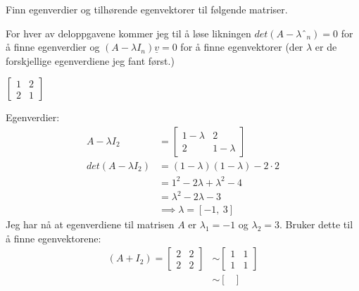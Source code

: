 \documentclass[11pt, a4paper, norsk]{NTNUoving}
\begin{document}
    \begin{oppgave}
        Finn egenverdier og tilhørende egenvektorer til følgende matriser.
        
        For hver av deloppgavene kommer jeg til å løse likningen $det(A - \lambda ˆ_{n}) = 0$ for å finne egenverdier og $(A-\lambda I_{n})\underline{v} = 0$ for å finne egenvektorer (der $\lambda$ er de forskjellige egenverdiene jeg fant først.)

        \begin{punkt}
            $\begin{bmatrix}
                1 & 2 \\
                2 & 1
            \end{bmatrix}$

            Egenverdier:
            \begin{align*}
                A - \lambda I_{2} &= \begin{bmatrix}
                    1 - \lambda & 2 \\
                    2 & 1 - \lambda
                \end{bmatrix}
                \\
                    det(A - \lambda I_{2}) &= (1- \lambda)(1 - \lambda) - 2 \cdot 2
                    \\
                                           &= 1^2 - 2\lambda + \lambda^2 - 4
                                           \\
                                           &= \lambda^2 - 2\lambda - 3
                                           \\
                                           &\implies \lambda = \left[ -1, \  3\right] 
            \end{align*}
            Jeg har nå at egenverdiene til matrisen $A$ er $\lambda_{1} = -1$ og $\lambda_2 = 3$. Bruker dette til å finne egenvektorene:
            \begin{align*}
                (A + I_{2}) = \begin{bmatrix}
                    2 & 2 \\
                    2 & 2
                \end{bmatrix} &\sim \begin{bmatrix}
                1 & 1 \\
                1 & 1 
                \end{bmatrix}
                \\
                &\sim \begin{bmatrix}

\end{bmatrix}
\end{align*}
\end{punkt}
\end{oppgave}
\end{document}
